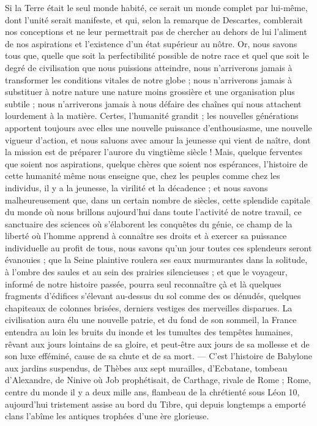 \documentclass[a4paper, 11pt, oneside]{article}
\begin{document}
Si la Terre était le seul monde habité, ce serait un monde complet par lui-même, dont l'unité serait manifeste, et qui, selon la remarque de Descartes, comblerait nos conceptions et ne leur permettrait pas de chercher au dehors de lui l'aliment de nos aspirations et l'existence d'un état supérieur au nôtre. Or, nous savons tous que, quelle que soit la perfectibilité possible de notre race et quel que soit le degré de civilisation que nous puissions atteindre, nous n'arriverons jamais à transformer les conditions vitales de notre globe ; nous n'arriverons jamais à substituer à notre nature une nature moins grossière et une organisation plus subtile ; nous n'arriverons jamais à nous défaire des chaînes qui nous attachent lourdement à la matière. Certes, l'humanité grandit ; les nouvelles générations apportent toujours avec elles une nouvelle puissance d'enthousiasme, une nouvelle vigueur d'action, et nous saluons avec amour la jeunesse qui vient de naître, dont la mission est de préparer l'aurore du vingtième siècle ! Mais, quelque ferventes que soient nos aspirations, quelque chères que soient nos espérances, l'histoire de cette humanité même nous enseigne que, chez les peuples comme chez les individus, il y a la jeunesse, la virilité et la décadence ; et nous savons malheureusement que, dans un certain nombre de siècles, cette splendide capitale du monde où nous brillons aujourd'hui dans toute l'activité de notre travail, ce sanctuaire des sciences où s'élaborent les conquêtes du génie, ce champ de la liberté où l'homme apprend à connaître ses droits et à exercer sa puissance individuelle au profit de tous, nous savons qu'un jour toutes ces splendeurs seront évanouies ; que la Seine plaintive roulera ses eaux murmurantes dans la solitude, à l'ombre des saules et au sein des prairies silencieuses ; et que le voyageur, informé de notre histoire passée, pourra seul reconnaître çà et là quelques fragments d'édifices s'élevant au-dessus du sol comme des os dénudés, quelques chapiteaux de colonnes brisées, derniers vestiges des merveilles disparues. La civilisation aura élu une nouvelle patrie, et du fond de son sommeil, la France entendra au loin les bruits du inonde et les tumultes des tempêtes humaines, rêvant aux jours lointains de sa gloire, et peut-être aux jours de sa mollesse et de son luxe efféminé, cause de sa chute et de sa mort. --- C'est l'histoire de Babylone aux jardins suspendus, de Thèbes aux sept murailles, d'Ecbatane, tombeau d'Alexandre, de Ninive où Job prophétisait, de Carthage, rivale de Rome ; Rome, centre du monde il y a deux mille ans, flambeau de la chrétienté sous Léon 10, aujourd'hui tristement assise au bord du Tibre, qui depuis longtemps a emporté clans l'abîme les antiques trophées d'une ère glorieuse.
\end{document}
